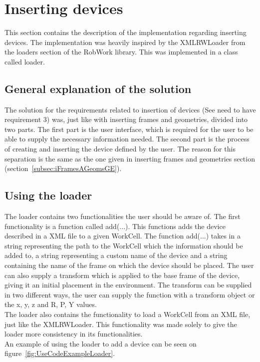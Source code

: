 \section{Inserting devices}
This section contains the description of the implementation regarding inserting devices. The implementation was heavily inspired by the XMLRWLoader from the loaders section of the RobWork library. This was implemented in a class called loader.

\subsection{General explanation of the solution}
The solution for the requirements related to insertion of devices (See need to have requirement 3) was, just like with inserting frames and geometries, divided into two parts. The first part is the user interface, which is required for the user to be able to supply the necessary information needed. The second part is the process of creating and inserting the device defined by the user. The reason for this separation is the same as the one given in inserting frames and geometries section (section~\ref{subsec:iFramesAGeomsGE}).

\subsection{Using the loader}
\label{subsec:usingLoader}
The loader contains two functionalities the user should be aware of. The first functionality is a function called add(...). This functions adds the device described in a XML file to a given WorkCell. The function add(...) takes in a string representing the path to the WorkCell which the information should be added to, a string representing a custom name of the device and a string containing the name of the frame on which the device should be placed. The user can also supply a transform which is applied to the base frame of the device, giving it an initial placement in the environment. The transform can be supplied in two different ways, the user can supply the function with a transform object or the x, y, z and R, P, Y values.\\
The loader also contains the functionality to load a WorkCell from an XML file, just like the XMLRWLoader. This functionality was made solely to give the loader more consistency in its functionalities.\\
An example of using the loader to add a device can be seen on figure~\ref{fig:UseCodeExampleLoader}.

